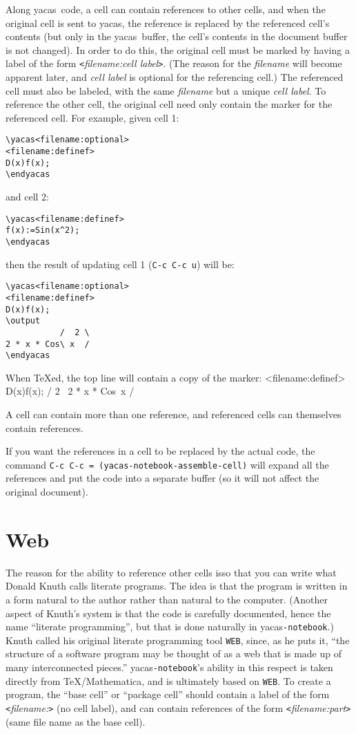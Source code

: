 \documentclass[12pt]{article}
\def\ys{\textsf{yacas}}
\def\yn{\textsf{yacas}\texttt{-notebook}}
\begin{document}
Along \ys\ code, a cell can contain references to other cells, and
when the original cell is sent to \ys, the reference is replaced by
the referenced cell's contents (but only in the \ys\ buffer, the
cell's contents in the document buffer is not changed).  In order to
do this, the original cell must be marked by having a label of the
form \texttt{<}\textit{filename:cell label}\texttt{>}.  (The reason
for the \textit{filename} will become apparent later, and \textit{cell
  label} is optional for the referencing cell.)  The referenced cell
must also be labeled, with the same \textit{filename} but a unique
\textit{cell label}.  To reference the other cell, the original cell
need only contain the marker for the referenced cell.  For example,
given cell 1:
\begin{verbatim}
\yacas<filename:optional>
<filename:definef>
D(x)f(x);
\endyacas
\end{verbatim}
and cell 2:
\begin{verbatim}
\yacas<filename:definef>
f(x):=Sin(x^2);
\endyacas
\end{verbatim}
then the result of updating cell 1 (\texttt{C-c C-c u}) will be:
\begin{verbatim}
\yacas<filename:optional>
<filename:definef>
D(x)f(x);
\output
           /  2 \
2 * x * Cos\ x  /
\endyacas
\end{verbatim}
When \TeX{}ed, the top line will contain a copy of the marker:
\newpage
\yacas<filename:optional>
<filename:definef>
D(x)f(x);
\output
           /  2 \
2 * x * Cos\ x  /
\endyacas

A cell can contain more than one reference, and referenced cells can
themselves contain references.

If you want the references in a cell to be replaced by the actual
code, the command \texttt{C-c C-c = (yacas-notebook-assemble-cell)} will
expand all the references and put the code into a separate buffer (so
it will not affect the original document).

\section{Web}


The reason for the ability to reference other cells isso that you can
write what Donald Knuth calls literate programs.  The idea is that the
program is written in a form natural to the author rather than natural
to the computer.  (Another aspect of Knuth's system is that the code
is carefully documented, hence the name ``literate programming'', but
that is done naturally in \yn.) Knuth called his original literate
programming tool \texttt{WEB}, since, as he puts it, ``the structure
of a software program may be thought of as a web that is made up of
many interconnected pieces.''  \yn's ability in this respect is
taken directly from \TeX/Mathematica, and is ultimately based on
\texttt{WEB}.  To create a program, the ``base cell'' or ``package
cell'' should contain a label of the form
\texttt{<}\textit{filename:}\texttt{>} (no cell label), and can
contain references of the form
\texttt{<}\textit{filename:part}\texttt{>} (same file name as the base
cell).  
\end{document}
